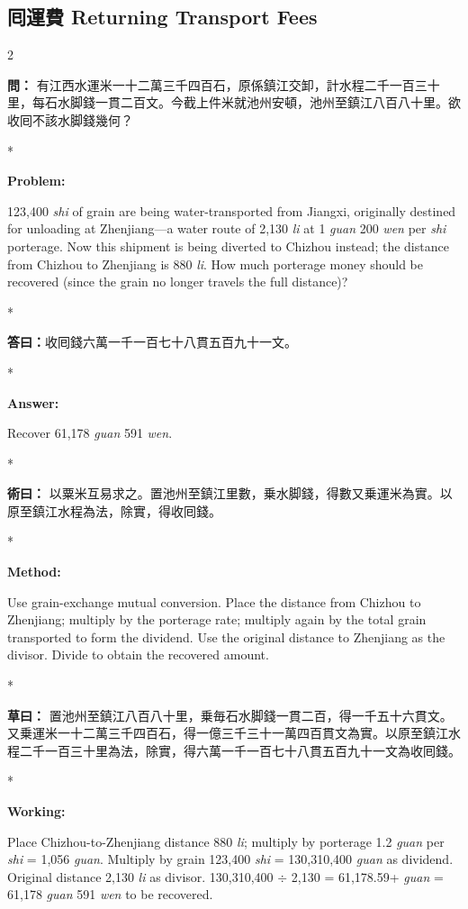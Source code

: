 \documentclass[11pt,a4paper]{article}
\newcommand{\CnQuestion}[1]{\par\noindent\textbf{\color{problemcolor}問：}#1\par\vspace{0.5ex}}
\newcommand{\CnAnswer}[1]{\par\noindent\textbf{\color{answercolor}答曰：}#1\par\vspace{0.5ex}}
\newcommand{\CnMethod}[1]{\par\noindent\textbf{\color{methodcolor}術曰：}#1\par\vspace{0.5ex}}
\newcommand{\CnWorking}[1]{\par\noindent\textbf{草曰：}#1\par\vspace{0.5ex}}
\newcommand{\EnQuestion}{\par\noindent\textbf{\color{problemcolor}Problem:}\par\vspace{0.5ex}}
\newcommand{\EnAnswer}{\par\noindent\textbf{\color{answercolor}Answer:}\par\vspace{0.5ex}}
\newcommand{\EnMethod}{\par\noindent\textbf{\color{methodcolor}Method:}\par\vspace{0.5ex}}
\newcommand{\EnWorking}{\par\noindent\textbf{Working:}\par\vspace{0.5ex}}
\newcommand{\switchCn}{\switchcolumn[0]*}
\newcommand{\switchEn}{\switchcolumn[1]*}
\begin{document}
\newpage

\subsection*{囘運費 \quad Returning Transport Fees}

\begin{paracol}{2}

\CnQuestion{%
有江西水運米一十二萬三千四百石，原係鎮江交卸，計水程二千一百三十里，每石水脚錢一貫二百文。今截上件米就池州安頓，池州至鎮江八百八十里。欲收囘不該水脚錢幾何？
}

\switchEn

\EnQuestion
123,400 \textit{shi} of grain are being water-transported from Jiangxi, originally destined for unloading at Zhenjiang---a water route of 2,130 \textit{li} at 1 \textit{guan} 200 \textit{wen} per \textit{shi} porterage. Now this shipment is being diverted to Chizhou instead; the distance from Chizhou to Zhenjiang is 880 \textit{li}. How much porterage money should be recovered (since the grain no longer travels the full distance)?

\switchCn

\CnAnswer{收囘錢六萬一千一百七十八貫五百九十一文。}

\switchEn

\EnAnswer Recover 61,178 \textit{guan} 591 \textit{wen}.

\switchCn

\CnMethod{%
以粟米互易求之。置池州至鎮江里數，乗水脚錢，得數又乗運米為實。以原至鎮江水程為法，除實，得收囘錢。
}

\switchEn

\EnMethod
Use grain-exchange mutual conversion. Place the distance from Chizhou to Zhenjiang; multiply by the porterage rate; multiply again by the total grain transported to form the dividend. Use the original distance to Zhenjiang as the divisor. Divide to obtain the recovered amount.

\switchCn

\CnWorking{%
置池州至鎮江八百八十里，乗毎石水脚錢一貫二百，得一千五十六貫文。又乗運米一十二萬三千四百石，得一億三千三十一萬四百貫文為實。以原至鎮江水程二千一百三十里為法，除實，得六萬一千一百七十八貫五百九十一文為收囘錢。
}

\switchEn

\EnWorking
Place Chizhou-to-Zhenjiang distance 880 \textit{li}; multiply by porterage 1.2 \textit{guan} per \textit{shi} = 1,056 \textit{guan}. Multiply by grain 123,400 \textit{shi} = 130,310,400 \textit{guan} as dividend. Original distance 2,130 \textit{li} as divisor. 130,310,400 $\div$ 2,130 = 61,178.59+ \textit{guan} = 61,178 \textit{guan} 591 \textit{wen} to be recovered.

\end{paracol}
\end{document}
